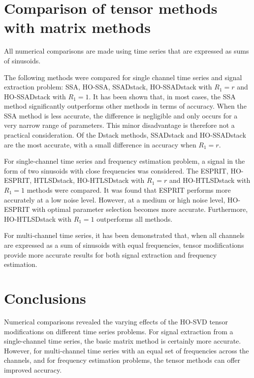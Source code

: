 \documentclass[12pt]{article}
\theoremstyle{definition}
\begin{document}
\section{Comparison of tensor methods with matrix methods}
All numerical comparisons are made using time series that are expressed as sums of sinusoids.

The following methods were compared for single channel time series
and signal extraction problem: SSA, HO-SSA, SSADstack, HO-SSADstack
with $R_1=r$ and HO-SSADstack with $R_1=1$. It has been shown that, in most cases, the SSA method significantly outperforms other methods in terms of accuracy. When the SSA method is less accurate, the difference is negligible and only occurs for a very narrow range of parameters. This minor disadvantage is therefore not a practical consideration. Of the Dstack methods, SSADstack and HO-SSADstack are the most accurate, with a small difference in accuracy when $R_1=r$.

For single-channel time series and frequency estimation problem, a
signal in the form of two sinusoids with close frequencies was
considered. The ESPRIT, HO-ESPRIT, HTLSDstack, HO-HTLSDstack with
$R_1=r$ and HO-HTLSDstack with $R_1=1$ methods were compared. It was found that ESPRIT performs more accurately at a low noise level. However, at a medium or high noise level, HO-ESPRIT with optimal parameter selection becomes more accurate. Furthermore, HO-HTLSDstack with $R_1=1$ outperforms all methods.

For multi-channel time series, it has been demonstrated that, when all channels are expressed as a sum of sinusoids with equal frequencies, tensor modifications provide more accurate results for both signal extraction and frequency estimation.

\section{Conclusions}
Numerical comparisons revealed the varying effects of the HO-SVD tensor modifications on different time series problems. For signal extraction from a single-channel time series, the basic matrix method is certainly more accurate. However, for multi-channel time series with an equal set of frequencies across the channels, and for frequency estimation problems, the tensor methods can offer improved accuracy.
\end{document}
